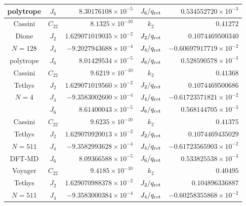 \begin{table}
\begin{tabular}{ccrcr}
{polytrope}                   & $J_6$     &  $8.30176108\times10^{-5}      $  &  $J_6/q_{\rm  rot}$  &  $0.534552720\times10^{-3}     $ \\
\hline
{Cassini}  & $C_{22}$  &  $8.1325\times10^{-10}         $  &  $k_2         $      &  $0.41272                      $ \\
{Dione}    & $J_2$     &  $1.629071019035\times10^{-2}  $  &  $J_2/q_{\rm  rot}$  &  $0.1074469500340              $ \\
{$N=128$}  & $J_4$     &  $-9.2027943688\times10^{-4}   $  &  $J_4/q_{\rm  rot}$  &  $-0.60697917719\times10^{-2}  $ \\
{polytrope}                   & $J_6$     &  $8.01429534\times10^{-5}      $  &  $J_6/q_{\rm  rot}$  &  $0.528590578\times10^{-3}     $ \\
\hline
{Cassini}   &  $C_{22}$  &  $9.6219\times10^{-10}         $  &  $k_2         $      &  $0.41368                      $  \\
{Tethys}    &  $J_2$     &  $1.629071019560\times10^{-2}  $  &  $J_2/q_{\rm  rot}$  &  $0.1074469500686              $  \\
{$N=4$}     &  $J_4$     &  $-9.3583002600\times10^{-4}   $  &  $J_4/q_{\rm  rot}$  &  $-0.61723571821\times10^{-2}  $  \\
                    &  $J_6$     &  $8.61400043\times10^{-5}      $  &  $J_6/q_{\rm  rot}$  &  $0.568144705\times10^{-3}     $  \\
                    \hline
{Cassini}   &  $C_{22}$  &  $9.6235\times10^{-10}         $  &  $k_2         $      &  $0.41375                     $  \\
{Tethys}    &  $J_2$     &  $1.629070920013\times10^{-2}  $  &  $J_2/q_{\rm  rot}$  &  $0.1074469435029              $  \\
{$N=511$}     &  $J_4$     &  $-9.3582993628\times10^{-4}   $  &  $J_4/q_{\rm  rot}$  &  $-0.61723565903\times10^{-2}  $  \\
{DFT-MD}                    &  $J_6$     &  $8.09366588\times10^{-5}      $  &  $J_6/q_{\rm  rot}$  &  $0.533825538\times10^{-3}     $  \\
\hline
{Voyager}   &  $C_{22}$  &  $9.4185\times10^{-10}         $  &  $k_2         $      &  $0.40495                      $  \\
{Tethys}    &  $J_2$     &  $1.629070988378\times10^{-2}  $  &  $J_2/q_{\rm  rot}$  &  $0.104896336887              $  \\
{$N=511$}     &  $J_4$     &  $-9.3583000384\times10^{-4}   $  &  $J_4/q_{\rm  rot}$  & $-0.60258355868\times10^{-2}  $  \\

\end{tabular}
\end{table}
